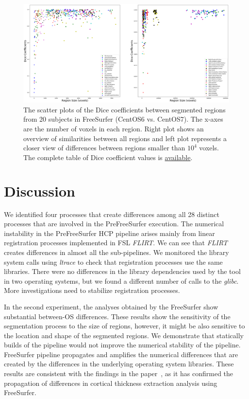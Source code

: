 \documentclass[a4paper,num-refs]{oup-contemporary}
\begin{document}
\begin{figure}
  \centering
    \includegraphics[width=\textwidth]{images/scatter_plot.png} 
    \caption{The scatter plots of the Dice coefficients between segmented regions 
            from 20 subjects in FreeSurfer (CentOS6 vs. CentOS7). 
            The x-axes are the number of voxels in each region.
            Right plot shows an overview of similarities between all regions and 
            left plot represents a closer view of differences between 
            regions smaller than $10^4$ voxels.
            The complete table of Dice coefficient values is 
            \href{https://github.com/ali4006/HCP-reproducibility-paper/blob/master/data/dice_values.csv}
            {available}.} 
    \label{fig:scatter_plot}
  \end{figure}


\section{Discussion}

We identified four processes that create differences 
among all 28 distinct processes that are involved in the PreFreeSurfer execution. 
The numerical instability in the 
PreFreeSurfer HCP pipeline arises mainly from linear 
registration processes implemented in FSL \emph{FLIRT}. 
We can see that \emph{FLIRT} creates differences in almost all the sub-pipelines. 
We monitored the library system calls using \emph{ltrace} to check that registration processes
use the same libraries. There were no differences in the library dependencies used by 
the tool in two operating systems, but we found a different number of calls to the \emph{glibc}.
More investigations need to stabilize registration processes.

In the second experiment, 
the analyses obtained by the FreeSurfer show substantial between-OS differences.
These results show the sensitivity of the segmentation process to the 
size of regions, however, it might be also sensitive to the location and shape of 
the segmented regions.
We demonstrate that statically builds of the pipeline would not improve the numerical stability of the pipeline. 
FreeSurfer pipeline propagates and amplifies the numerical differences that are created by the 
differences in the underlying operating system libraries.
These results are consistent with the findings in the paper~\cite{Glatard2015}, 
as it has confirmed the propagation of differences in cortical thickness extraction analysis using FreeSurfer.
\end{document}
